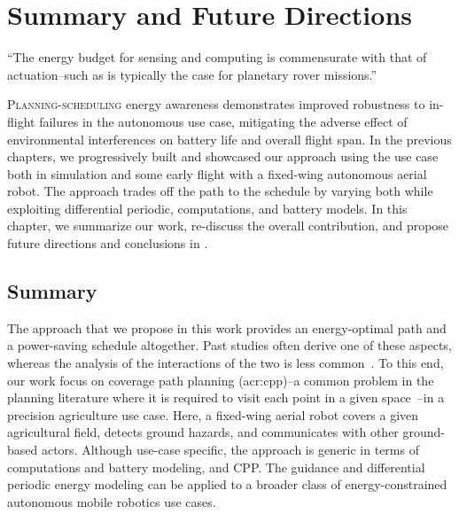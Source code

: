 
%
%
\chapter{Summary and Future Directions}
\label{cp:conc}

\begin{chapquote}{\cite{ondruska2015scheduled}}
  ``The energy budget for sensing and computing is commensurate with  that of actuation--such as is typically the case for planetary rover missions.''
\end{chapquote}
  
\vspace*{1em}



\lettrine{P}{lanning-scheduling} energy awareness demonstrates improved robustness to in-flight failures in the autonomous use case, mitigating the adverse effect of environmental interferences on battery life and overall flight span. In the previous chapters, we progressively built and showcased our approach using the use case both in simulation and some early flight with a fixed-wing autonomous aerial robot. The approach trades off the path to the schedule by varying both while exploiting differential periodic, computations, and battery models. In this chapter, we summarize our work, re-discuss the overall contribution, and propose future directions and conclusions in .


\section{Summary}
\label{sec:conc-summ}

The approach that we propose in this work provides an energy-optimal path and a power-saving schedule altogether. Past studies often derive one of these aspects, whereas the analysis of the interactions of the two is less common~\citep{brateman2006energy,sudhakar2020balancing}. To this end, our work focus on coverage path planning (\Gls{acr:cpp})--a common problem in the planning literature where it is required to visit each point in a given space~\citep{choset2001coverage,galceran2013survey}--in a precision agriculture use case. Here, a fixed-wing aerial robot covers a given agricultural field, detects ground hazards, and communicates with other ground-based actors. Although use-case specific, the approach is generic in terms of computations and battery modeling, and CPP. The guidance and differential periodic energy modeling can be applied to a broader class of energy-constrained autonomous mobile robotics use cases.

